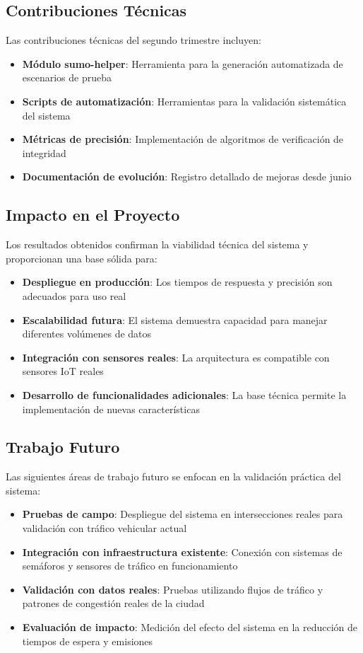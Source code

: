 \documentclass[onecolumn]{article}
\begin{document}
\subsection{Contribuciones Técnicas}

Las contribuciones técnicas del segundo trimestre incluyen:

\begin{itemize}
    \item \textbf{Módulo sumo-helper}: Herramienta para la generación automatizada de escenarios de prueba
    \item \textbf{Scripts de automatización}: Herramientas para la validación sistemática del sistema
    \item \textbf{Métricas de precisión}: Implementación de algoritmos de verificación de integridad
    \item \textbf{Documentación de evolución}: Registro detallado de mejoras desde junio
\end{itemize}

\subsection{Impacto en el Proyecto}

Los resultados obtenidos confirman la viabilidad técnica del sistema y proporcionan una base sólida para:

\begin{itemize}
    \item \textbf{Despliegue en producción}: Los tiempos de respuesta y precisión son adecuados para uso real
    \item \textbf{Escalabilidad futura}: El sistema demuestra capacidad para manejar diferentes volúmenes de datos
    \item \textbf{Integración con sensores reales}: La arquitectura es compatible con sensores IoT reales
    \item \textbf{Desarrollo de funcionalidades adicionales}: La base técnica permite la implementación de nuevas características
\end{itemize}

\subsection{Trabajo Futuro}

Las siguientes áreas de trabajo futuro se enfocan en la validación práctica del sistema:

\begin{itemize}
    \item \textbf{Pruebas de campo}: Despliegue del sistema en intersecciones reales para validación con tráfico vehicular actual
    \item \textbf{Integración con infraestructura existente}: Conexión con sistemas de semáforos y sensores de tráfico en funcionamiento
    \item \textbf{Validación con datos reales}: Pruebas utilizando flujos de tráfico y patrones de congestión reales de la ciudad
    \item \textbf{Evaluación de impacto}: Medición del efecto del sistema en la reducción de tiempos de espera y emisiones
\end{itemize}
\end{document}

